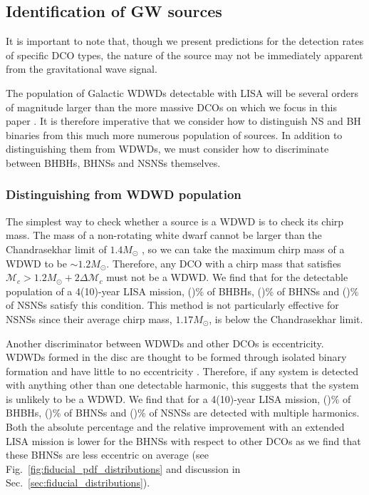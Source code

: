\subsection{Identification of GW sources}
It is important to note that, though we present predictions for the detection rates of specific DCO types, the nature of the source may not be immediately apparent from the gravitational wave signal.

The population of Galactic WDWDs detectable with LISA will be several orders of magnitude larger than the more massive DCOs on which we focus in this paper \citep[e.g.][]{Korol+2017}. It is therefore imperative that we consider how to distinguish NS and BH binaries from this much more numerous population of sources. In addition to distinguishing them from WDWDs, we must consider how to discriminate between BHBHs, BHNSs and NSNSs themselves.

\subsubsection{Distinguishing from WDWD population}\label{sec:WDWD_distinguish}
The simplest way to check whether a source is a WDWD is to check its chirp mass. The mass of a non-rotating white dwarf cannot be larger than the Chandrasekhar limit of $1.4 \unit{M_\odot}$ \citep{Chandrasekhar+1931, Hamada+1961}, so we can take the maximum chirp mass of a WDWD to be $\sim 1.2 \unit{M_{\odot}}$. Therefore, any DCO with a chirp mass that satisfies $\mathcal{M}_c > 1.2 \unit{M_{\odot}} + 2 \Delta \mathcal{M}_c$ must not be a WDWD. We find that for the detectable population of a 4(10)-year LISA mission, \BHBHAboveMaxWDWDFourPerc{}(\BHBHAboveMaxWDWDTenPerc{})\% of BHBHs, \BHNSAboveMaxWDWDFourPerc{}(\BHNSAboveMaxWDWDTenPerc{})\% of BHNSs and \NSNSAboveMaxWDWDFourPerc{}(\NSNSAboveMaxWDWDTenPerc{})\% of NSNSs satisfy this condition. This method is not particularly effective for NSNSs since their average chirp mass, $1.17 \unit{M_\odot}$, is below the Chandrasekhar limit.

Another discriminator between WDWDs and other DCOs is eccentricity. WDWDs formed in the disc are thought to be formed through isolated binary formation and have little to no eccentricity \citep[e.g.][]{Nelemans+2001}. Therefore, if any system is detected with anything other than one detectable harmonic, this suggests that the system is unlikely to be a WDWD. We find that for a 4(10)-year LISA mission, \BHBHMultipleHarmonicsFourPerc{}(\BHBHMultipleHarmonicsTenPerc{})\% of BHBHs, \BHNSMultipleHarmonicsFourPerc{}(\BHNSMultipleHarmonicsTenPerc{})\% of BHNSs and \NSNSMultipleHarmonicsFourPerc(\NSNSMultipleHarmonicsTenPerc{})\% of NSNSs are detected with multiple harmonics. Both the absolute percentage and the relative improvement with an extended LISA mission is lower for the BHNSs with respect to other DCOs as we find that these BHNSs are less eccentric on average (see Fig.~\ref{fig:fiducial_pdf_distributions} and discussion in Sec.~\ref{sec:fiducial_distributions}).


